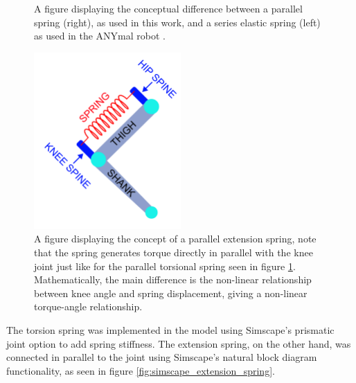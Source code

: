 \begin{figure}[htbp]
\begin{minipage}[t]{0.45\textwidth}
    \end{minipage}
    \caption{A figure displaying the conceptual difference between a parallel spring (right), as used in this work, and a series elastic spring (left) as used in the ANYmal robot \cite{hutter_anymal_2016}.}
    \label{fig:parallel_vs_series_spring}
\end{figure}


\begin{figure}
    \centering
    \includegraphics[width=0.5\textwidth]{Images/DOF2_w_extension_spring.png}
    \caption{A figure displaying the concept of a parallel extension spring, note that the spring generates torque directly in parallel with the knee joint just like for the parallel torsional spring seen in figure \ref{fig:parallel_vs_series_spring}. Mathematically, the main difference is the non-linear relationship between knee angle and spring displacement, giving a non-linear torque-angle relationship.}
    \label{fig:extension_spring}
\end{figure}

The torsion spring was implemented in the model using Simscape's prismatic joint option to add spring stiffness. The extension spring, on the other hand, was connected in parallel to the joint using Simscape's natural block diagram functionality, as seen in figure \ref{fig:simscape_extension_spring}. 

